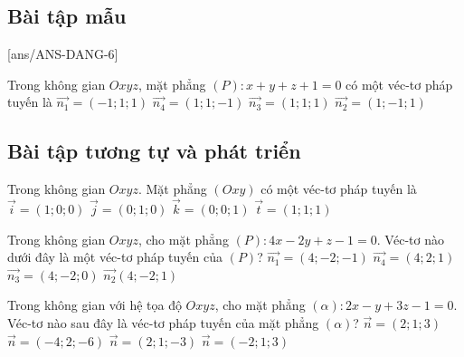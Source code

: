\subsection{Bài tập mẫu}
[ans/ANS-DANG-6]
\begin{khung}
\begin{vd}%
	Trong không gian $Oxyz$, mặt phẳng $(P)\colon x+y+z+1=0$ có một véc-tơ pháp tuyến là
	\choice
	{$\overrightarrow{n_1}=(-1;1;1)$}
	{$\overrightarrow{n_4}=(1;1;-1)$}
	{\True $\overrightarrow{n_3}=(1;1;1)$}
	{$\overrightarrow{n_2}=(1;-1;1)$}
\end{vd}
\end{khung}

\subsection{Bài tập tương tự và phát triển}
\begin{ex}%
	Trong không gian $Oxyz$. Mặt phẳng $(Oxy)$ có một véc-tơ pháp tuyến là
	\choice
	{$\overrightarrow{i}=(1;0;0)$}
	{$\overrightarrow{j}=(0;1;0)$}
	{\True $\overrightarrow{k}=(0;0;1)$}
	{$\overrightarrow{t}=(1;1;1)$}
\end{ex}
\begin{ex}%
	Trong không gian $Oxyz$, cho mặt phẳng $(P) \colon 4x-2y+z-1=0$. Véc-tơ nào dưới đây là một véc-tơ pháp tuyến của $(P)$?
	\choice
	{$\overrightarrow{n_1}=(4;-2;-1)$}
	{$\overrightarrow{n_4}=(4;2;1)$}
	{$\overrightarrow{n_3}=(4;-2;0)$}
	{\True $\overrightarrow{n_2}(4;-2;1)$}
\end{ex}

\begin{ex}%
	Trong không gian với hệ tọa độ $Oxyz$, cho mặt phẳng $(\alpha) \colon 2x-y+3z-1=0$. Véc-tơ nào sau đây là véc-tơ pháp tuyến của mặt phẳng $(\alpha)$?
	\choice
	{$\overrightarrow{n}=(2;1;3)$}
	{\True $\overrightarrow{n}=(-4;2;-6)$}
	{$\overrightarrow{n}=(2;1;-3)$}
	{$\overrightarrow{n}=(-2;1;3)$}
\end{ex}

